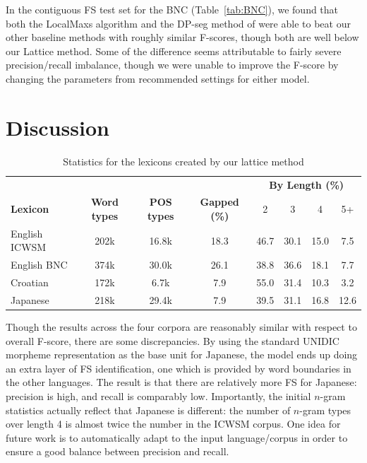 \documentclass[11pt,letterpaper]{article}
\newcommand{\z}{\phantom{0}}
\newcommand{\tabref}[2][]{Table#1~\ref{#2}\xspace}
\begin{document}
In the contiguous FS test set for the BNC (\tabref{tab:BNC}), we found that both the LocalMaxs algorithm and the DP-seg method of  were able to beat our other baseline methods with roughly similar F-scores, though both are well below our Lattice method. Some of the difference seems attributable to fairly severe precision/recall imbalance, though we were unable to improve the F-score by changing the parameters from recommended settings for either model.


\section{Discussion} \label{sec:discussion}


\begin{table}[!bt]
 
 \begin{center}
 \begin{tabular}{lccccccc}
\toprule
& & & & \multicolumn{4}{c}{\bf{By Length (\%) }} \\
       \cmidrule(lr){5-8}	
\bf{Lexicon} & \bf{Word types} & \bf{POS types} & \bf{Gapped} (\%) & 2 & 3 & 4 & 5+ \\ 
\midrule
English ICWSM & 202k & 16.8k & 18.3 & 46.7 & 30.1 & 15.0 & \z7.5  \\
English BNC & 374k &  30.0k& 26.1& 38.8 & 36.6 & 18.1 & \z7.7 \\
Croatian & 172k & \z6.7k & \z7.9& 55.0& 31.4 & 10.3 & \z3.2 \\
Japanese & 218k &  29.4k &\z7.9& 39.5 & 31.1& 16.8 & 12.6 \\
\bottomrule
\end{tabular}
  \caption{Statistics for the lexicons created by our lattice method}
	 \label{tab:lexstats}

 \end{center}


 \end{table}


Though the results across the four corpora are reasonably similar with respect to overall F-score, there are some discrepancies. By using the standard UNIDIC morpheme representation as the base unit for Japanese, the model ends up doing an extra layer of FS identification, one which is provided by word boundaries in the other languages. The result is that there are relatively more FS for Japanese: precision is high, and recall is comparably low.  Importantly, the initial $n$-gram statistics actually reflect that Japanese is different: the number of $n$-gram types over length 4 is almost twice the number in the ICWSM corpus. One idea for future work is to automatically adapt to the input language/corpus in order to ensure a good balance between precision and recall.
\end{document}
